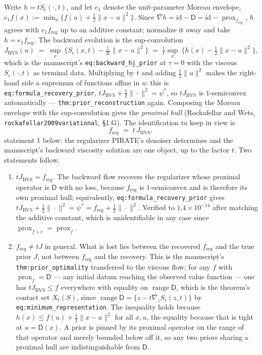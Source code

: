 \documentclass[11pt]{article}
\theoremstyle{definition}
\newcommand{\D}{\mathsf{D}}
\newcommand{\freg}{f_{\mathrm{reg}}}
\newcommand{\prox}{\operatorname{prox}}
\newcommand{\range}{\operatorname{range}}
\newcommand{\code}[1]{\texttt{#1}}
\newcommand{\Jbvs}{J_{\mathrm{BVS}}}
\begin{document}
Write $h = tS_\epsilon(\cdot,t)$, and let $e_1$ denote the unit-parameter Moreau envelope, $e_1 f(x) := \min_u\{f(u) + \tfrac12\|x-u\|^2\}$. Since $\nabla h = \mathrm{id} - \D = \mathrm{id} - \prox_{\freg}$, $h$ agrees with $e_1\freg$ up to an additive constant; normalize it away and take $h = e_1\freg$. The backward evolution is the sup-convolution
\begin{equation}
\label{eq:backward}
\Jbvs(u) \;=\; \sup_x\ \Big\{ S_\epsilon(x,t) - \tfrac{1}{2t}\|x-u\|^2 \Big\} \;=\; \tfrac{1}{t}\sup_x\ \big\{ h(x) - \tfrac12\|x-u\|^2 \big\},
\end{equation}
which is the manuscript's \code{eq:backward\_hj\_prior} at $\tau = 0$ with the viscous $S_\epsilon(\cdot,t)$ as terminal data. Multiplying by $t$ and adding $\tfrac12\|u\|^2$ makes the right-hand side a supremum of functions affine in $u$: this is \code{eq:formula\_recovery\_prior}, $t\Jbvs + \tfrac12\|\cdot\|^2 = \psi^*$, so $t\Jbvs$ is $1$-semiconvex automatically — \code{thm:prior\_reconstruction} again. Composing the Moreau envelope with the sup-convolution gives the \emph{proximal hull} (Rockafellar and Wets, \code{rockafellar2009variational}, \S1.G). The identification to keep in view is
\begin{equation}
\label{eq:three_way}
\freg \;=\; t\,\Jbvs,
\end{equation}
statement 1 below: the regularizer PIRATE's denoiser determines and the manuscript's backward viscosity solution are one object, up to the factor $t$. Two statements follow.

\begin{enumerate}[leftmargin=2em]
\item $t\Jbvs = \freg$. The backward flow recovers the regularizer whose proximal operator is $\D$ with no loss, because $\freg$ is $1$-semiconvex and is therefore its own proximal hull; equivalently, \code{eq:formula\_recovery\_prior} gives $t\Jbvs + \tfrac12\|\cdot\|^2 = \psi^* = \freg + \tfrac12\|\cdot\|^2$. Verified to $1.4\times10^{-14}$ after matching the additive constant, which is unidentifiable in any case since $\prox_{f+c} = \prox_f$.
\item $\freg \ne tJ$ in general. What is lost lies between the recovered $\freg$ and the true prior $J$, not between $\freg$ and the recovery. This is the manuscript's \code{thm:prior\_optimality} transferred to the viscous flow: for any $f$ with $\prox_f = \D$ — any initial datum reaching the observed value function — one has $t\Jbvs\le f$ everywhere with equality on $\range\D$, which is the theorem's contact set $X_t(S)$, since $\range\D = \{z - t\nabla_z S_\epsilon(z,t)\}$ by \code{eq:minimum\_representation}. The inequality holds because $h(x)\le f(u) + \tfrac12\|x-u\|^2$ for all $x,u$, the equality because that is tight at $u=\D(x)$. A prior is pinned by its proximal operator on the range of that operator and merely bounded below off it, so any two priors sharing a proximal hull are indistinguishable from $\D$.
\end{enumerate}
\end{document}
